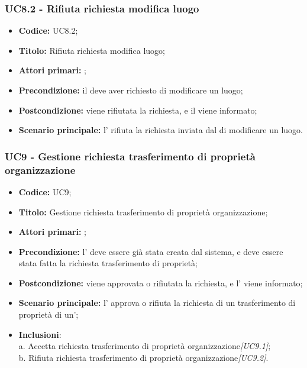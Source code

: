 \documentclass[casi-duso]{subfiles}
\begin{document}
\subsubsection{UC8.2 - Rifiuta richiesta modifica luogo}
\label{subsub:UC8.2}
\begin{itemize}
  \item \textbf{Codice:} UC8.2;
  \item \textbf{Titolo:} Rifiuta richiesta modifica luogo;
  \item \textbf{Attori primari:} ;
  \item \textbf{Precondizione:} il  deve aver richiesto di modificare un luogo;
  \item \textbf{Postcondizione:} viene rifiutata la richiesta, e il  viene informato;
  \item \textbf{Scenario principale:} l' rifiuta la richiesta inviata dal  di modificare un luogo.
\end{itemize}


\subsubsection{UC9 - Gestione richiesta trasferimento di proprietà organizzazione}
\label{subsub:UC9}

\begin{itemize}
  \item \textbf{Codice:} UC9;
  \item \textbf{Titolo:} Gestione richiesta trasferimento di proprietà organizzazione;
  \item \textbf{Attori primari:} ;
  \item \textbf{Precondizione:} l' deve essere già stata creata dal sistema, e deve essere stata fatta la richiesta trasferimento di proprietà;
  \item \textbf{Postcondizione:} viene approvata o rifiutata la richiesta, e l' viene informato;
  \item \textbf{Scenario principale:} l' approva o rifiuta la richiesta di un trasferimento di proprietà di un';
  \item \textbf{Inclusioni}:
        \\a. Accetta richiesta trasferimento di proprietà organizzazione\emph{[UC9.1]};
        \\b. Rifiuta richiesta trasferimento di proprietà organizzazione\emph{[UC9.2]}.
\end{itemize}
\end{document}

